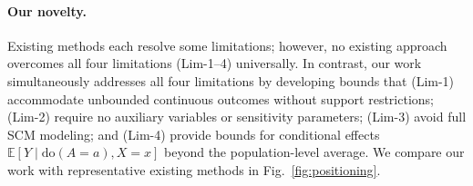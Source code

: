 \paragraph{Our novelty.} Existing methods each resolve some limitations; however, no existing approach overcomes all four limitations (Lim-1--4) universally. In contrast, our work simultaneously addresses all four limitations by developing bounds that (Lim-1) accommodate unbounded continuous outcomes without support restrictions; (Lim-2) require no auxiliary variables or sensitivity parameters; (Lim-3) avoid full SCM modeling; and (Lim-4) provide bounds for conditional effects $\mathbb{E}[Y \mid \mathrm{do}(A=a),X=x]$ beyond the population-level average. We compare our work with representative existing methods in Fig.~\ref{fig:positioning}.